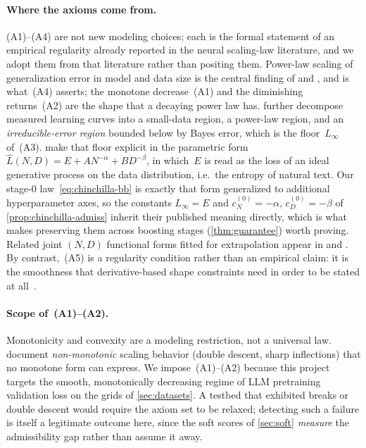 \documentclass[11pt]{article}
\newcommand{\Lhat}{\hat{L}}
\theoremstyle{plain}
\theoremstyle{remark}
\begin{document}
\paragraph{Where the axioms come from.}
(A1)--(A4) are not new modeling choices; each is the formal statement of an empirical regularity already reported in the neural scaling-law literature, and we adopt them from that literature rather than positing them.
Power-law scaling of generalization error in model and data size is the central finding of \citet{hestness2017scaling} and \citet{kaplan2020scaling}, and is what~(A4) asserts; the monotone decrease~(A1) and the diminishing returns~(A2) are the shape that a decaying power law has.
\citet{hestness2017scaling} further decompose measured learning curves into a small-data region, a power-law region, and an \emph{irreducible-error region} bounded below by Bayes error, which is the floor~$L_\infty$ of~(A3).
\citet{hoffmann2022chinchilla} make that floor explicit in the parametric form $\Lhat(N,D) = E + A N^{-\alpha} + B D^{-\beta}$, in which~$E$ is read as the loss of an ideal generative process on the data distribution, i.e.\ the entropy of natural text.
Our stage-0 law~\eqref{eq:chinchilla-bb} is exactly that form generalized to additional hyperparameter axes, so the constants $L_\infty = E$ and $c_N^{(0)} = -\alpha$, $c_D^{(0)} = -\beta$ of \cref{prop:chinchilla-admiss} inherit their published meaning directly, which is what makes preserving them across boosting stages (\cref{thm:guarantee}) worth proving.
Related joint $(N,D)$ functional forms fitted for extrapolation appear in \citet{rosenfeld2020constructive} and \citet{alabdulmohsin2022revisiting}.
By contrast,~(A5) is a regularity condition rather than an empirical claim: it is the smoothness that derivative-based shape constraints need in order to be stated at all~\citep{kronberger2022shape}.

\paragraph{Scope of~(A1)--(A2).}
Monotonicity and convexity are a modeling restriction, not a universal law.
\citet{caballero2023broken} document \emph{non-monotonic} scaling behavior (double descent, sharp inflections) that no monotone form can express.
We impose~(A1)--(A2) because this project targets the smooth, monotonically decreasing regime of LLM pretraining validation loss on the grids of \cref{sec:datasets}.
A testbed that exhibited breaks or double descent would require the axiom set to be relaxed; detecting such a failure is itself a legitimate outcome here, since the soft scores of \cref{sec:soft} \emph{measure} the admissibility gap rather than assume it away.
\end{document}
